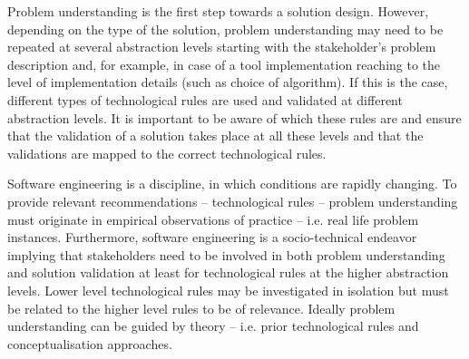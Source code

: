 \documentclass[graybox]{svmult}
\begin{document}

Problem understanding is the first step towards a solution design. However, depending on the type of the solution, problem understanding may need to be repeated at several abstraction levels starting with the stakeholder's problem description and, for example, in case of a tool implementation reaching to the level of implementation details (such as  choice of algorithm). If this is the case, different types of technological rules are used and validated at different abstraction levels. It is important to be aware of which these rules are and ensure that the validation of a solution takes place at all these levels and that the validations are mapped to the correct technological rules. 

Software engineering is a discipline, in which conditions are rapidly changing. To provide relevant recommendations -- technological rules -- problem understanding must originate in empirical observations of practice -- i.e. real life problem instances. Furthermore, software engineering is a socio-technical endeavor implying that stakeholders need to be involved in both problem understanding and solution validation at least for technological rules at the higher abstraction levels. Lower level technological rules may be investigated in isolation but must be related to the higher level rules to be of relevance. 
Ideally problem understanding can be guided by theory -- i.e. prior technological rules and conceptualisation approaches. 





\end{document}
